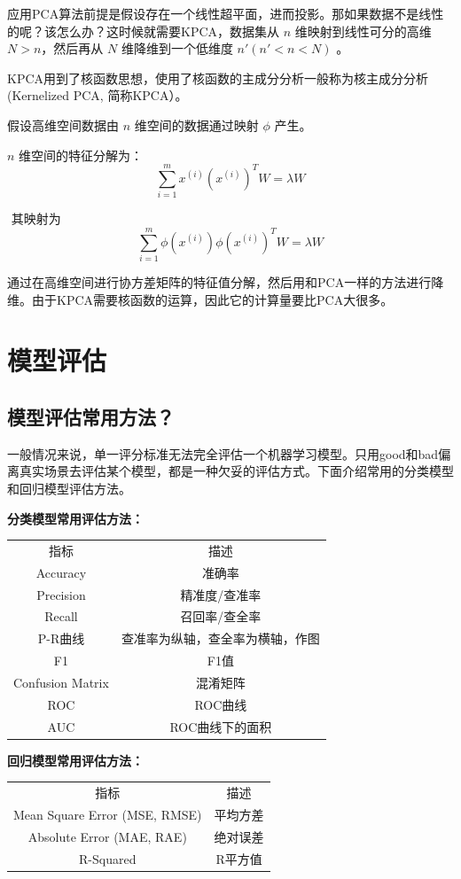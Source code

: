 ​
应用PCA算法前提是假设存在一个线性超平面，进而投影。那如果数据不是线性的呢？该怎么办？这时候就需要KPCA，数据集从
$n$ 维映射到线性可分的高维 $N >n$，然后再从 $N$ 维降维到一个低维度
$n'(n'<n<N)$ 。

​
KPCA用到了核函数思想，使用了核函数的主成分分析一般称为核主成分分析(Kernelized
PCA, 简称KPCA）。

假设高维空间数据由 $n​$ 维空间的数据通过映射 $\phi​$ 产生。

​ $n$ 维空间的特征分解为： \[
\sum^m_{i=1} x^{(i)} \left( x^{(i)} \right)^T W = \lambda W
\]

​ 其映射为 \[
\sum^m_{i=1} \phi \left( x^{(i)} \right) \phi \left( x^{(i)} \right)^T W = \lambda W
\]

​
通过在高维空间进行协方差矩阵的特征值分解，然后用和PCA一样的方法进行降维。由于KPCA需要核函数的运算，因此它的计算量要比PCA大很多。

\section{ 模型评估}\label{ux6a21ux578bux8bc4ux4f30}

\subsection{模型评估常用方法？}\label{ux6a21ux578bux8bc4ux4f30ux5e38ux7528ux65b9ux6cd5}

​
一般情况来说，单一评分标准无法完全评估一个机器学习模型。只用good和bad偏离真实场景去评估某个模型，都是一种欠妥的评估方式。下面介绍常用的分类模型和回归模型评估方法。

\textbf{分类模型常用评估方法：}

\begin{longtable}[]{cc}
指标 & 描述\tabularnewline
Accuracy & 准确率\tabularnewline
Precision & 精准度/查准率\tabularnewline
Recall & 召回率/查全率\tabularnewline
P-R曲线 & 查准率为纵轴，查全率为横轴，作图\tabularnewline
F1 & F1值\tabularnewline
Confusion Matrix & 混淆矩阵\tabularnewline
ROC & ROC曲线\tabularnewline
AUC & ROC曲线下的面积\tabularnewline
\end{longtable}

\textbf{回归模型常用评估方法：}

\begin{longtable}[]{cc}
指标 & 描述\tabularnewline
Mean Square Error (MSE, RMSE) & 平均方差\tabularnewline
Absolute Error (MAE, RAE) & 绝对误差\tabularnewline
R-Squared & R平方值\tabularnewline
\end{longtable}

